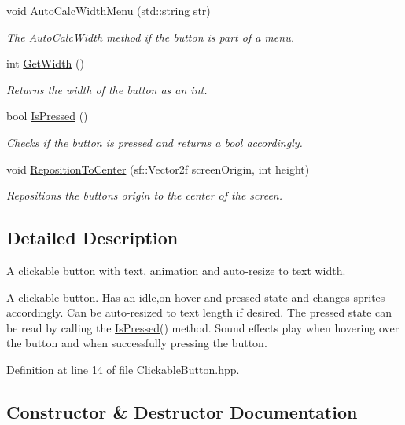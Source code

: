 \begin{DoxyCompactItemize}
void \hyperlink{class_clickable_button_af39cab51ca37c5465bbfec0e5268b768}{Auto\+Calc\+Width\+Menu} (std\+::string str)
\begin{DoxyCompactList}\small\item\em The Auto\+Calc\+Width method if the button is part of a menu. \end{DoxyCompactList}\item 
int \hyperlink{class_clickable_button_a45a3f33e2e11191afb413617a665d2f5}{Get\+Width} ()
\begin{DoxyCompactList}\small\item\em Returns the width of the button as an int. \end{DoxyCompactList}\item 
bool \hyperlink{class_clickable_button_aa63eaa88bbfaf717e46b5ab4cfa6d12c}{Is\+Pressed} ()
\begin{DoxyCompactList}\small\item\em Checks if the button is pressed and returns a bool accordingly. \end{DoxyCompactList}\item 
void \hyperlink{class_clickable_button_ae96a7ed06c7eb63b37eefeb45407426e}{Reposition\+To\+Center} (sf\+::\+Vector2f screen\+Origin, int height)
\begin{DoxyCompactList}\small\item\em Repositions the button\textquotesingle{}s origin to the center of the screen. \end{DoxyCompactList}\end{DoxyCompactItemize}


\subsection{Detailed Description}
A clickable button with text, animation and auto-\/resize to text width. 

A clickable button. Has an idle,\textquotesingle{}on-\/hover\textquotesingle{} and pressed state and changes sprites accordingly. Can be auto-\/resized to text length if desired. The pressed state can be read by calling the \hyperlink{class_clickable_button_aa63eaa88bbfaf717e46b5ab4cfa6d12c}{Is\+Pressed()} method. Sound effects play when hovering over the button and when successfully pressing the button. 

Definition at line 14 of file Clickable\+Button.\+hpp.



\subsection{Constructor \& Destructor Documentation}
\mbox{\label{class_clickable_button_a2941caf8b0b04291cb6ae09df4deb5aa}} 
